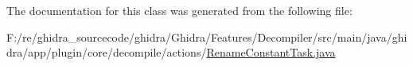 The documentation for this class was generated from the following file\+:\begin{DoxyCompactItemize}
\item 
F\+:/re/ghidra\+\_\+sourcecode/ghidra/\+Ghidra/\+Features/\+Decompiler/src/main/java/ghidra/app/plugin/core/decompile/actions/\mbox{\hyperlink{_rename_constant_task_8java}{Rename\+Constant\+Task.\+java}}\end{DoxyCompactItemize}
